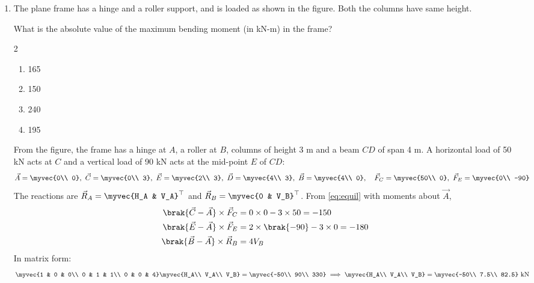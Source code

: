 \begin{enumerate}[label=\thesubsection.\arabic*, ref=\thesubsection.\theenumi, itemsep=0pt, leftmargin=*]
\item The plane frame has a hinge and a roller support, and is loaded as shown in the figure. Both the columns have same height.

What is the absolute value of the maximum bending moment (in kN-m) in the frame? \gate
\begin{multicols}{2}
\begin{enumerate}[label=\alph*), itemsep=0pt]
\item 165
\item 150
\item 240
\item 195
\end{enumerate}
\end{multicols}
\solution From the figure, the frame has a hinge at $A$, a roller at $B$, columns of height 3 m and a beam $CD$ of span 4 m. A horizontal load of 50 kN acts at $C$ and a vertical load of 90 kN acts at the mid-point $E$ of $CD$:
\begin{align}
\vec{A} = \myvec{0\\ 0},\ \vec{C} = \myvec{0\\ 3},\ \vec{E} = \myvec{2\\ 3},\ \vec{D} = \myvec{4\\ 3},\ \vec{B} = \myvec{4\\ 0},\quad \vec{F}_C = \myvec{50\\ 0},\ \vec{F}_E = \myvec{0\\ -90}
\end{align}
The reactions are $\vec{R}_A = \myvec{H_A & V_A}^\top$ and $\vec{R}_B = \myvec{0 & V_B}^\top$. From \eqref{eq:equil} with moments about $\vec{A}$,
\begin{align}
\brak{\vec{C}-\vec{A}}\times\vec{F}_C &= 0\times 0 - 3\times 50 = -150\\
\brak{\vec{E}-\vec{A}}\times\vec{F}_E &= 2\times\brak{-90} - 3\times 0 = -180\\
\brak{\vec{B}-\vec{A}}\times\vec{R}_B &= 4V_B
\end{align}
In matrix form:
\begin{align}
\myvec{1 & 0 & 0\\ 0 & 1 & 1\\ 0 & 0 & 4}\myvec{H_A\\ V_A\\ V_B} = \myvec{-50\\ 90\\ 330} \implies \myvec{H_A\\ V_A\\ V_B} = \myvec{-50\\ 7.5\\ 82.5}\text{ kN}

\end{align}
\end{enumerate}
